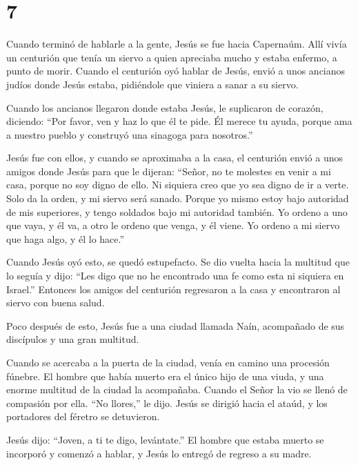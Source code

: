\hypertarget{section-6}{%
\section{7}\label{section-6}}

 Cuando terminó de hablarle a la gente, Jesús se fue hacia
Capernaúm.  Allí vivía un centurión que tenía un siervo a
quien apreciaba mucho y estaba enfermo, a punto de morir. 
Cuando el centurión oyó hablar de Jesús, envió a unos ancianos judíos
donde Jesús estaba, pidiéndole que viniera a sanar a su siervo.

 Cuando los ancianos llegaron donde estaba Jesús, le
suplicaron de corazón, diciendo: ``Por favor, ven y haz lo que él te
pide. Él merece tu ayuda,  porque ama a nuestro pueblo y
construyó una sinagoga para nosotros.''

 Jesús fue con ellos, y cuando se aproximaba a la casa, el
centurión envió a unos amigos donde Jesús para que le dijeran: ``Señor,
no te molestes en venir a mi casa, porque no soy digno de ello.
 Ni siquiera creo que yo sea digno de ir a verte. Solo da la
orden, y mi siervo será sanado.  Porque yo mismo estoy bajo
autoridad de mis superiores, y tengo soldados bajo mi autoridad también.
Yo ordeno a uno que vaya, y él va, a otro le ordeno que venga, y él
viene. Yo ordeno a mi siervo que haga algo, y él lo hace.''

 Cuando Jesús oyó esto, se quedó estupefacto. Se dio vuelta
hacia la multitud que lo seguía y dijo: ``Les digo que no he encontrado
una fe como esta ni siquiera en Israel.''  Entonces los
amigos del centurión regresaron a la casa y encontraron al siervo con
buena salud.

 Poco después de esto, Jesús fue a una ciudad llamada Naín,
acompañado de sus discípulos y una gran multitud.

 Cuando se acercaba a la puerta de la ciudad, venía en
camino una procesión fúnebre. El hombre que había muerto era el único
hijo de una viuda, y una enorme multitud de la ciudad la acompañaba.
 Cuando el Señor la vio se llenó de compasión por ella.
``No llores,'' le dijo.  Jesús se dirigió hacia el ataúd, y
los portadores del féretro se detuvieron.

Jesús dijo: ``Joven, a ti te digo, levántate.''  El hombre
que estaba muerto se incorporó y comenzó a hablar, y Jesús lo entregó de
regreso a su madre.

